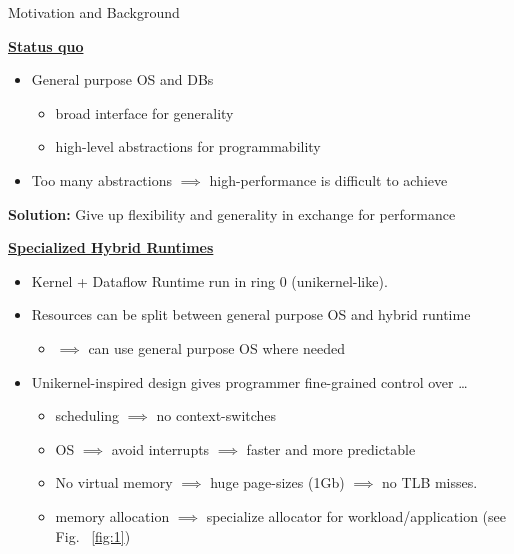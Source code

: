 \begin{block}{Motivation and Background}




\underline{\textbf{Status quo}}
  \begin{itemize}
  \item General purpose OS and DBs%
    \begin{itemize}
    \item broad interface for generality
    \item high-level abstractions for programmability
    \end{itemize}
    \item Too many abstractions $\implies$ high-performance is difficult to achieve
    \end{itemize}
    \begin{center}
 \alert{\textbf{Solution:} Give up flexibility and generality in exchange for performance}
\end{center}
    
\underline{\textbf{Specialized Hybrid Runtimes}}
    \begin{itemize}
    \item Kernel + Dataflow Runtime run in ring 0 (unikernel-like).
    \item Resources can be split between general purpose OS and hybrid runtime
      \begin{itemize}
      \item $\implies$ can use general purpose OS where needed
    \end{itemize}

    \item {Unikernel-inspired design gives programmer fine-grained control over \ldots}
      \begin{itemize}
      \item scheduling $\implies$ no context-switches
      \item OS $\implies$ avoid interrupts $\implies$ faster and more predictable
      \item No virtual memory $\implies$ huge page-sizes (1Gb) $\implies$ no TLB misses.
      \item memory allocation $\implies$ specialize allocator for workload/application (see Fig.~ \ref{fig:1})
      \end{itemize}
    \end{itemize}


\end{block}
